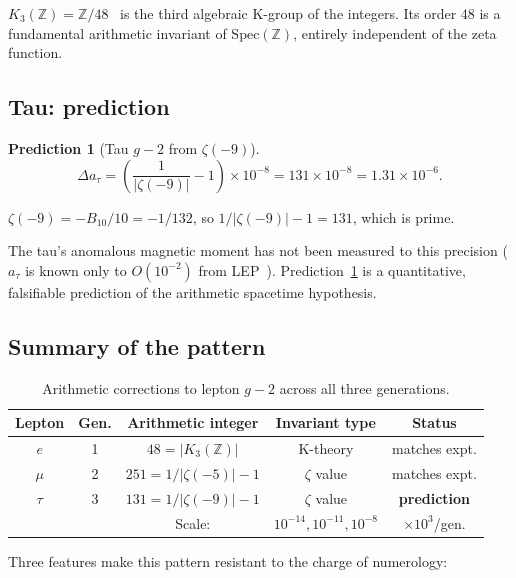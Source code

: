 \documentclass[11pt,a4paper]{article}
\newtheorem{prediction}[theorem]{Prediction}
\newcommand{\Spec}{\mathrm{Spec}}
\begin{document}
$K_3(\mathbb{Z}) = \mathbb{Z}/48$~\cite{Lee1969} is the third
algebraic K-group of the integers. Its order $48$ is a fundamental
arithmetic invariant of $\Spec(\mathbb{Z})$, entirely independent
of the zeta function.

\subsection{Tau: prediction}

\begin{prediction}[Tau $g-2$ from $\zeta(-9)$]
\label{pred:tau}
\begin{equation}
  \Delta a_\tau = \left(\frac{1}{|\zeta(-9)|} - 1\right)
  \times 10^{-8} = 131 \times 10^{-8}
  = 1.31 \times 10^{-6}.
  \label{eq:tau}
\end{equation}
\end{prediction}

$\zeta(-9) = -B_{10}/10 = -1/132$, so
$1/|\zeta(-9)| - 1 = 131$, which is prime.

The tau's anomalous magnetic moment has not been measured
to this precision ($a_\tau$ is known only to $O(10^{-2})$ from
LEP~\cite{DELPHI2004}). Prediction~\ref{pred:tau} is a
quantitative, falsifiable prediction of the arithmetic
spacetime hypothesis.

\subsection{Summary of the pattern}

\begin{table}[h]
\centering
\caption{Arithmetic corrections to lepton $g-2$ across
all three generations.}
\label{tab:pattern}
\begin{tabular}{@{}ccccc@{}}
\toprule
Lepton & Gen. & Arithmetic integer & Invariant type & Status \\
\midrule
$e$ & 1 & $48 = |K_3(\mathbb{Z})|$ & K-theory & matches expt. \\
$\mu$ & 2 & $251 = 1/|\zeta(-5)| - 1$ & $\zeta$ value & matches expt. \\
$\tau$ & 3 & $131 = 1/|\zeta(-9)| - 1$ & $\zeta$ value & \textbf{prediction} \\
\midrule
& & Scale: & $10^{-14}, 10^{-11}, 10^{-8}$ & $\times 10^3$/gen. \\
\bottomrule
\end{tabular}
\end{table}

Three features make this pattern resistant to the charge of
numerology:
\end{document}
